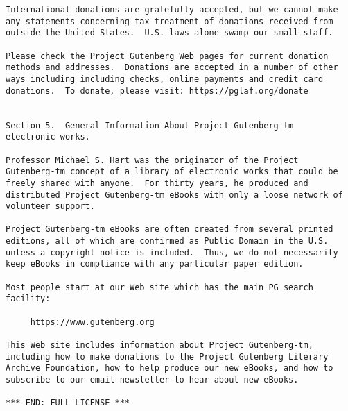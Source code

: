 \documentclass[letterpaper,12pt,oneside,openany]{memoir}
\begin{document}
\begin{verbatim}
International donations are gratefully accepted, but we cannot make
any statements concerning tax treatment of donations received from
outside the United States.  U.S. laws alone swamp our small staff.

Please check the Project Gutenberg Web pages for current donation
methods and addresses.  Donations are accepted in a number of other
ways including including checks, online payments and credit card
donations.  To donate, please visit: https://pglaf.org/donate


Section 5.  General Information About Project Gutenberg-tm
electronic works.

Professor Michael S. Hart was the originator of the Project
Gutenberg-tm concept of a library of electronic works that could be
freely shared with anyone.  For thirty years, he produced and
distributed Project Gutenberg-tm eBooks with only a loose network of
volunteer support.

Project Gutenberg-tm eBooks are often created from several printed
editions, all of which are confirmed as Public Domain in the U.S.
unless a copyright notice is included.  Thus, we do not necessarily
keep eBooks in compliance with any particular paper edition.

Most people start at our Web site which has the main PG search
facility:

     https://www.gutenberg.org

This Web site includes information about Project Gutenberg-tm,
including how to make donations to the Project Gutenberg Literary
Archive Foundation, how to help produce our new eBooks, and how to
subscribe to our email newsletter to hear about new eBooks.

*** END: FULL LICENSE ***
\end{verbatim}
\end{document}
